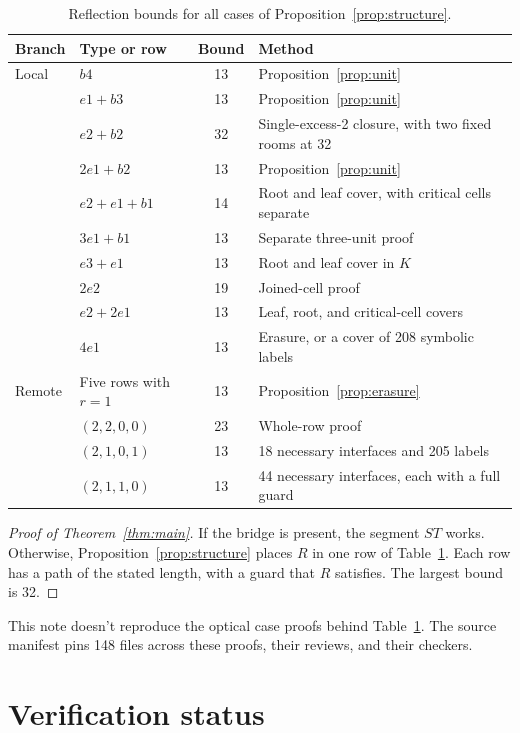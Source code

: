 \documentclass[11pt]{article}
\theoremstyle{remark}
\begin{document}
\begin{table}[ht]
\centering
\small
\begin{tabular}{llcl}
\hline
Branch & Type or row & Bound & Method\\
\hline
Local & $b4$ & 13 & Proposition~\ref{prop:unit}\\
 & $e1{+}b3$ & 13 & Proposition~\ref{prop:unit}\\
 & $e2{+}b2$ & 32 & Single-excess-2 closure, with two fixed rooms at 32\\
 & $2e1{+}b2$ & 13 & Proposition~\ref{prop:unit}\\
 & $e2{+}e1{+}b1$ & 14 & Root and leaf cover, with critical cells separate\\
 & $3e1{+}b1$ & 13 & Separate three-unit proof\\
 & $e3{+}e1$ & 13 & Root and leaf cover in $K$\\
 & $2e2$ & 19 & Joined-cell proof\\
 & $e2{+}2e1$ & 13 & Leaf, root, and critical-cell covers\\
 & $4e1$ & 13 & Erasure, or a cover of 208 symbolic labels\\
\hline
Remote & Five rows with $r=1$ & 13 & Proposition~\ref{prop:erasure}\\
 & $(2,2,0,0)$ & 23 & Whole-row proof\\
 & $(2,1,0,1)$ & 13 & 18 necessary interfaces and 205 labels\\
 & $(2,1,1,0)$ & 13 & 44 necessary interfaces, each with a full guard\\
\hline
\end{tabular}
\caption{Reflection bounds for all cases of Proposition~\ref{prop:structure}.}
\label{tab:cases}
\end{table}

\begin{proof}[Proof of Theorem~\ref{thm:main}]
If the bridge is present, the segment $ST$ works. Otherwise, Proposition~\ref{prop:structure} places $R$ in one row of Table~\ref{tab:cases}. Each row has a path of the stated length, with a guard that $R$ satisfies. The largest bound is 32.
\end{proof}

This note doesn't reproduce the optical case proofs behind Table~\ref{tab:cases}. The source manifest pins 148 files across these proofs, their reviews, and their checkers.

\section{Verification status}\label{sec:status}
\end{document}
